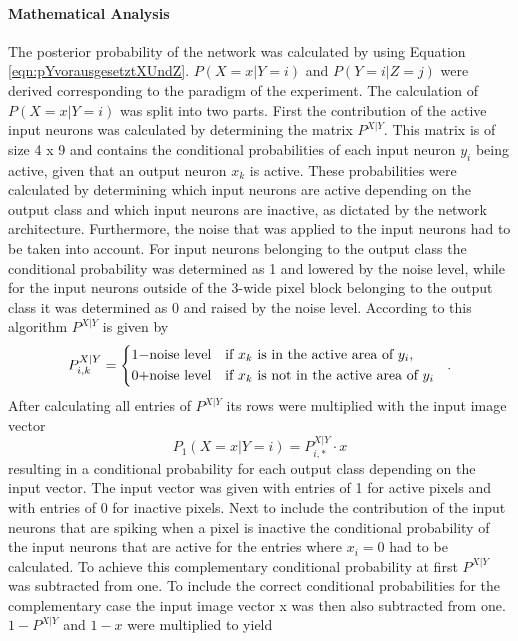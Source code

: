 \paragraph{Mathematical Analysis}
The posterior probability of the network was calculated by using Equation \ref{eqn:pYvorausgesetztXUndZ}.
$P(X=x|Y=i)$ and $P(Y=i|Z=j)$ were derived corresponding to the paradigm of the experiment.
 The calculation of $P(X=x|Y=i)$ was split into two parts. First the contribution of the active input neurons was calculated by determining the matrix $P^{X|Y}$. This matrix is of size 4 x 9 and contains the conditional probabilities of each input neuron $y_i$ being active, given that an output neuron $x_k$ is active. These probabilities were calculated by determining which input neurons are active depending on the output class and which input neurons are inactive, as dictated by the network architecture. Furthermore, the noise that was applied to the input neurons had to be taken into account. For input neurons belonging to the output class the conditional probability was determined as 1 and lowered by the noise level, while for the input neurons outside of the 3-wide pixel block belonging to the output class it was determined as 0 and raised by the noise level. According to this algorithm $P^{X|Y}$ is given by
\begin{equation}
\label{eqn:PXvorausgesetztYIf}
P_{i,k}^{X|Y} = \begin{dcases*} 1 - $noise level$ & if $x_k$ is in the active area of $y_i$, \\
0 + $noise level$ & \text{if $x_k$ is not in the active area of $ y_i $ } \end{dcases*}.\end{equation}
  After calculating all entries of $P^{X|Y}$ its rows were multiplied with the input image vector
\begin{equation}
\label{eqn:p1XvorausgesetztYMalX}
P_1(X = x|Y = i) = P^{X|Y}_{i,*} \cdot x
\end{equation}
resulting in a conditional probability for each output class depending on the input vector. The input vector was given with entries of 1 for active pixels and with entries of 0 for inactive pixels.
Next to include the contribution of the input neurons that are spiking when a pixel is inactive the conditional probability of the input neurons that are active for the entries where $x_i = 0$ had to be calculated. To achieve this complementary conditional probability at first $P^{X|Y}$ was subtracted from one. To include the correct conditional probabilities for the complementary case the input image vector x was then also subtracted from one. $1 - P^{X|Y}$ and $1 - x$ were multiplied to yield
